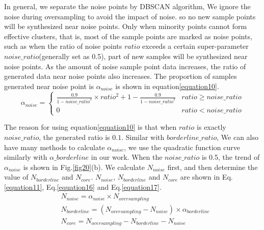 \documentclass[ida]{iosart2x}
\begin{document}
In general, 
we separate the noise points by DBSCAN algorithm,
We ignore the noise during oversampling to avoid the impact of noise.
so no new sample points will be synthesized near noise points.
Only when minority points cannot form effective clusters, that is,
most of the sample points are marked as noise points, 
such as when the ratio of noise points $ratio$ exceeds a certain 
super-parameter $noise\_ratio$(generally set as 0.5),
part of new samples will be synthesized near noise points.
As the amount of noise sample point data increases, 
the ratio of generated data near noise points also increases. 
The proportion of samples generated near noise point
 is $\alpha_{noise}$ is shown in equation\ref{equation10}.
\begin{equation}
  \label{equation10}
  \alpha_{noise}=
  \begin{cases}
  \frac{0.9}{1-{noise\_{ratio}}^2}\times ratio^2+1-\frac{0.9}{1-{noise\_ratio}^2} & ratio \ge noise\_ratio\\
  0                                                                               & ratio < noise\_ratio
  \end{cases}
\end{equation}

The reason for using equation\ref{equation10} is that when $ratio$ is exactly
$noise\_ratio$, the generated ratio is $0.1$. Similar with $borderline\_ratio$,
We can also have many methods to calculate $\alpha_{noise}$,
we use the quadratic function curve similarly with $\alpha\_borderline$ in our work.
When the $noise\_ratio$ is 0.5, the trend of $\alpha_{noise}$ is shown in Fig.\ref{fig20}(b).
We calculate $N_{noise}$ first, and then determine the value of $N_{borderline}$ and $N_{core}$.
$N_{noise}$, $N_{borderline}$ 
and $N_{core}$ are shown in Eq.\ref{equation11}, Eq.\ref{equation16}
and Eq.\ref{equation17}.
\begin{align}
  \label{equation11} & N_{noise}=\alpha_{noise} \times N_{oversampling} \\
  \label{equation16} & N_{borderline}=(N_{oversampling}-N_{noise})\times \alpha_{borderline}\\
  \label{equation17} & N_{core}=N_{oversampling}-N_{borderline}-N_{noise}
\end{align}
\end{document}
